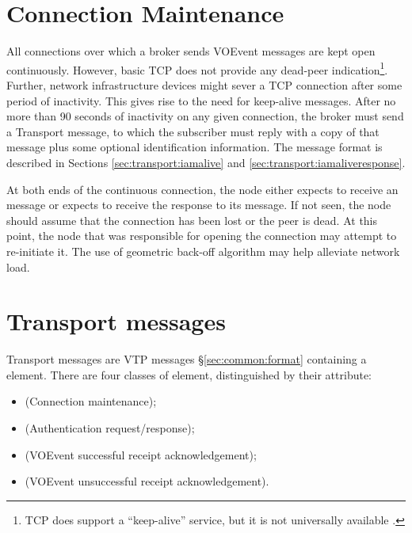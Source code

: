 \documentclass[a4paper,11pt]{ivoa}
\begin{document}
\section{Connection Maintenance}
\label{sec:maintenance}

All connections over which a broker sends VOEvent messages are kept open
continuously. However, basic TCP does not provide any dead-peer
indication\footnote{ TCP does support a ``keep-alive'' service, but it is not
universally available \citep{Braden:1989}.}. Further, network infrastructure
devices might sever a TCP connection after some period of inactivity. This
gives rise to the need for keep-alive messages. After no more than 90 seconds
of inactivity on any given connection, the broker must send a Transport
 message, to which the subscriber must reply with a copy of
that message plus some optional identification information. The message format
is described in Sections \ref{sec:transport:iamalive} and
\ref{sec:transport:iamaliveresponse}.

At both ends of the continuous connection, the node either expects to receive
an  message or expects to receive the response to its
 message. If not seen, the node should assume that the
connection has been lost or the peer is dead. At this point, the node that was
responsible for opening the connection may attempt to re-initiate it. The use
of geometric back-off algorithm may help alleviate network load.

\section{Transport messages}
\label{sec:transport}

Transport messages are VTP messages \S\ref{sec:common:format} containing a
 element. There are four classes of
 element, distinguished by their 
attribute:

\begin{itemize}
\item{ (Connection maintenance);}
\item{ (Authentication request/response);}
\item{ (VOEvent successful receipt acknowledgement);}
\item{ (VOEvent unsuccessful receipt acknowledgement).}
\end{itemize}
\end{document}
